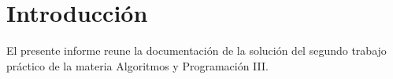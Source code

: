 \documentclass[../informe.tex]{subfiles}
\begin{document}
\section{Introducción}\label{sec:intro}

El presente informe reune la documentación de la solución del segundo trabajo práctico
de la materia Algoritmos y Programación III.




\end{document}
